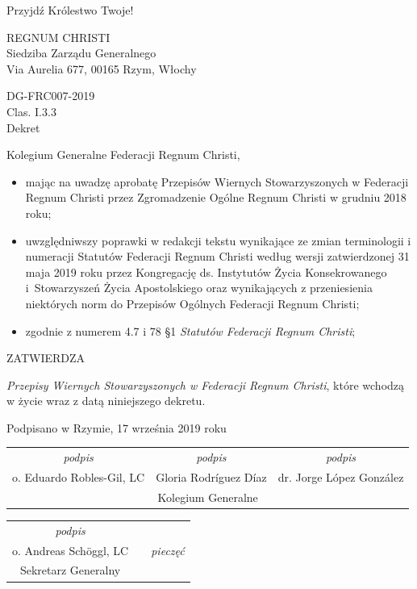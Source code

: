 \begin{framed}
	\begin{footnotesize}
		\begin{center}
			Przyjdź Królestwo Twoje!
			
			REGNUM CHRISTI\\
			Siedziba Zarządu Generalnego\\
			Via Aurelia 677, 00165 Rzym, Włochy 
		\end{center}
		
		DG-FRC007-2019\\
		Clas. I.3.3\\
		Dekret
		
		Kolegium Generalne Federacji Regnum Christi,
		\begin{itemize}
			
			\item mając na uwadzę aprobatę Przepisów Wiernych Stowarzyszonych w Federacji Regnum Christi przez Zgromadzenie Ogólne Regnum Christi w grudniu 2018 roku; 
			
			\item uwzględniwszy poprawki w redakcji tekstu wynikające ze zmian terminologii i numeracji Statutów Federacji Regnum Christi według wersji zatwierdzonej 31 maja 2019 roku przez Kongregację ds. Instytutów Życia Konsekrowanego \mbox{i Stowarzyszeń} Życia Apostolskiego oraz wynikających z przeniesienia niektórych norm do Przepisów Ogólnych Federacji Regnum Christi;
			
			\item zgodnie z numerem 4.7 i 78 \S{}1 {\em Statutów Federacji Regnum Christi};
		\end{itemize}
		\begin{center}
			ZATWIERDZA 
		\end{center}
		
		{\em Przepisy Wiernych Stowarzyszonych w Federacji Regnum Christi}, które wchodzą w życie wraz z datą niniejszego dekretu.
		\begin{center}
			Podpisano w Rzymie, 17 września 2019 roku
			\begin{tabular}
				{ c c c } {\em podpis} & {\em podpis} & {\em podpis} \\
				o. Eduardo Robles-Gil, LC & Gloria Rodríguez Díaz & dr. Jorge López González \\
				\multicolumn{3}{c}{Kolegium Generalne} 
			\end{tabular}
			\begin{tabular}
				{ c c c } {\em podpis} & & \\
				o. Andreas Schöggl, LC & & {\em pieczęć} \\
				Sekretarz Generalny & & 
			\end{tabular}
		\end{center}
	\end{footnotesize}
\end{framed}

